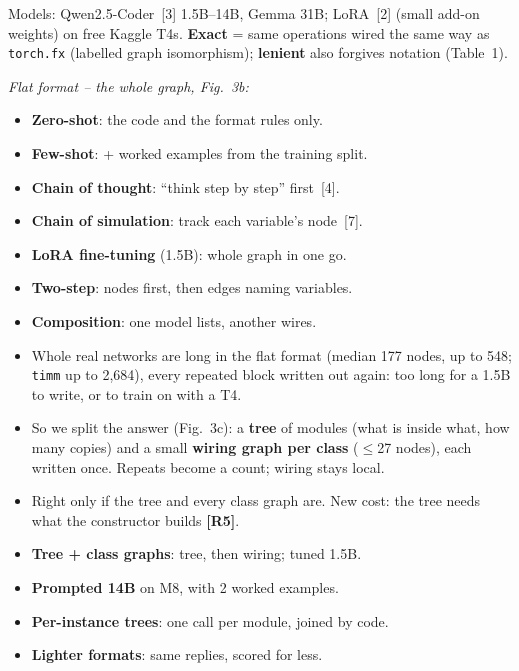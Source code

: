 \documentclass[10pt]{article}
\newcommand{\tg}[1]{\textcolor{tagc}{\textbf{[#1]}}}
\newcommand{\sect}[1]{\vspace{1pt}{\large\bfseries #1}\par}
\newcommand{\sub}[1]{\vspace{1pt}{\bfseries #1}\par}
\begin{document}
\begin{multicols}{2}
\sect{3\quad Methods and approaches}
Models: Qwen2.5-Coder~[3] 1.5B--14B, Gemma 31B; LoRA~[2] (small add-on weights) on free Kaggle T4s.
\textbf{Exact} = same operations wired the same way as \texttt{torch.fx} (labelled graph isomorphism);
\textbf{lenient} also forgives notation (Table~1).

{\emph{Flat format -- the whole graph, Fig.~3b:}}
\begin{itemize}[label={},leftmargin=3.25em,labelsep=0pt,labelwidth=0pt,itemindent=-3.25em]
\item \makebox[3.25em][l]{\tg{M1}}\textbf{Zero-shot}: the code and the format rules only.
\item \makebox[3.25em][l]{\tg{M2}}\textbf{Few-shot}: + worked examples from the training split.
\item \makebox[3.25em][l]{\tg{M3}}\textbf{Chain of thought}: ``think step by step'' first~[4].
\item \makebox[3.25em][l]{\tg{M4}}\textbf{Chain of simulation}: track each variable's node~[7].
\item \makebox[3.25em][l]{\tg{M5}}\textbf{LoRA fine-tuning} (1.5B): whole graph in one go.
\item \makebox[3.25em][l]{\tg{M6}}\textbf{Two-step}: nodes first, then edges naming variables.
\item \makebox[3.25em][l]{\tg{M7}}\textbf{Composition}: one model lists, another wires.
\end{itemize}
\sub{The second format, and why (19 Nov)}
\begin{itemize}
\item Whole real networks are long in the flat format (median 177 nodes, up to 548; \texttt{timm} up to
2{,}684), every repeated block written out again: too long for a 1.5B to write, or to train on with a T4.
\item So we split the answer (Fig.~3c): a \textbf{tree} of modules (what is inside what, how many copies) and a
small \textbf{wiring graph per class} ($\le$27 nodes), each written once. Repeats become a count; wiring stays local.
\item Right only if the tree and every class graph are. New cost: the tree needs what the constructor builds \tg{R5}.
\end{itemize}
\begin{itemize}[label={},leftmargin=3.25em,labelsep=0pt,labelwidth=0pt,itemindent=-3.25em]
\item \makebox[3.25em][l]{\tg{M8}}\textbf{Tree + class graphs}: tree, then wiring; tuned 1.5B.
\item \makebox[3.25em][l]{\tg{M9}}\textbf{Prompted 14B} on M8, with 2 worked examples.
\item \makebox[3.25em][l]{\tg{M10}}\textbf{Per-instance trees}: one call per module, joined by code.
\item \makebox[3.25em][l]{\tg{M11}}\textbf{Lighter formats}: same replies, scored for less.
\end{itemize}


\end{multicols}
\end{document}
